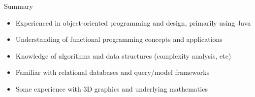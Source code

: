 \cvitem
    {Summary}
    {\begin{itemize}
        \item Experienced in object-oriented programming and design, primarily using Java
        \item Understanding of functional programming concepts and applications
        \item Knowledge of algorithms and data structures (complexity analysis, etc)
        \item Familiar with relational databases and query/model frameworks
        \item Some experience with 3D graphics and underlying mathematics
    \end{itemize}}
    \vspace*{-\baselineskip}